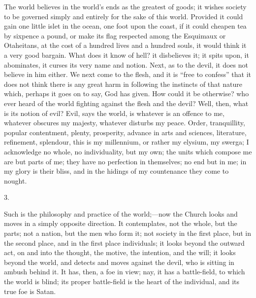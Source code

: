 The world believes in the world's ends as the greatest of goods; it
wishes society to be governed simply and entirely for the sake of this
world. Provided it could gain one little islet in the ocean, one foot
upon the coast, if it could cheapen tea by sixpence a pound, or make
its flag respected among the Esquimaux or Otaheitans, at the cost of a
hundred lives and a hundred souls, it would think it a very good
bargain. What does it know of hell? it disbelieves it; it spits upon,
it abominates, it curses its very name and notion. Next, as to the
devil, it does not believe in him either. We next come to the flesh,
and it is ``free to confess'' that it does not think there is
any great harm in following the instincts of that nature which,
perhaps it goes on to say, God has given. How could it be otherwise?
who ever heard of the world fighting against the flesh and the devil?
Well, then, what is its notion of evil? Evil, says the world, is
whatever is an offence to me, whatever obscures my majesty, whatever
disturbs my peace. Order, tranquillity, popular contentment, plenty,
prosperity, advance in arts and sciences, literature, refinement,
splendour, this is my millennium, or rather my elysium, my swerga; I
acknowledge no whole, no individuality, but my own; the units which
compose me are but parts of me; they have no perfection in themselves;
no end but in me; in my glory is their bliss, and in the hidings of my
countenance they come to nought.

3.

Such is the philosophy and practice of the world;—now the Church
looks and moves in a simply opposite direction. It contemplates, not
the whole, but the parts; not a nation, but the men who form it; not
society in the first place, but in the second place, and in the first
place individuals; it looks beyond the outward act, on and into the
thought, the motive, the intention, and the will; it looks beyond the
world, and detects and moves against the devil, who is sitting in
ambush behind it. It has, then, a foe in view; nay, it has a
battle-field, to which the world is blind; its proper battle-field is
the heart of the individual, and its true foe is Satan.

